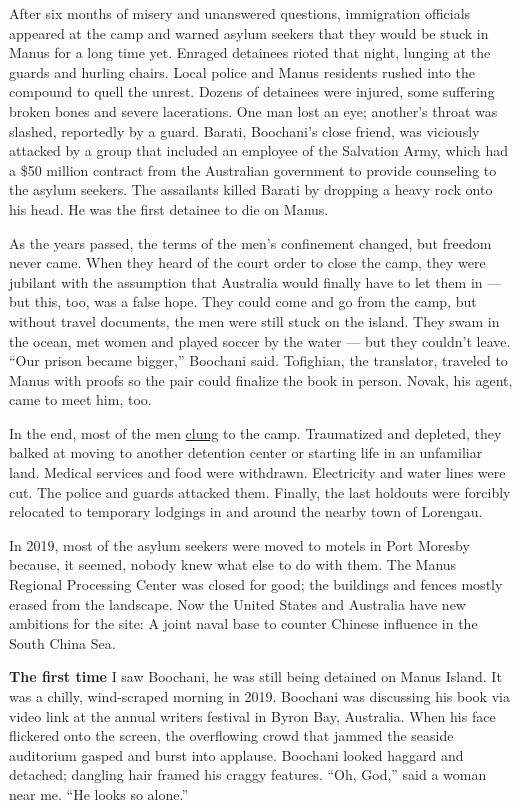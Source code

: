 After six months of misery and unanswered questions, immigration
officials appeared at the camp and warned asylum seekers that they would
be stuck in Manus for a long time yet. Enraged detainees rioted that
night, lunging at the guards and hurling chairs. Local police and Manus
residents rushed into the compound to quell the unrest. Dozens of
detainees were injured, some suffering broken bones and severe
lacerations. One man lost an eye; another's throat was slashed,
reportedly by a guard. Barati, Boochani's close friend, was viciously
attacked by a group that included an employee of the Salvation Army,
which had a \$50 million contract from the Australian government to
provide counseling to the asylum seekers. The assailants killed Barati
by dropping a heavy rock onto his head. He was the first detainee to die
on Manus.

As the years passed, the terms of the men's confinement changed, but
freedom never came. When they heard of the court order to close the
camp, they were jubilant with the assumption that Australia would
finally have to let them in --- but this, too, was a false hope. They
could come and go from the camp, but without travel documents, the men
were still stuck on the island. They swam in the ocean, met women and
played soccer by the water --- but they couldn't leave. ``Our prison
became bigger,'' Boochani said. Tofighian, the translator, traveled to
Manus with proofs so the pair could finalize the book in person. Novak,
his agent, came to meet him, too.

In the end, most of the men
\href{https://www.nytimes.com/2017/11/02/world/australia/manus-island-refugees.html}{clung}
to the camp. Traumatized and depleted, they balked at moving to another
detention center or starting life in an unfamiliar land. Medical
services and food were withdrawn. Electricity and water lines were cut.
The police and guards attacked them. Finally, the last holdouts were
forcibly relocated to temporary lodgings in and around the nearby town
of Lorengau.

In 2019, most of the asylum seekers were moved to motels in Port Moresby
because, it seemed, nobody knew what else to do with them. The Manus
Regional Processing Center was closed for good; the buildings and fences
mostly erased from the landscape. Now the United States and Australia
have new ambitions for the site: A joint naval base to counter Chinese
influence in the South China Sea.

\textbf{The first time} I saw Boochani, he was still being detained on
Manus Island. It was a chilly, wind-scraped morning in 2019. Boochani
was discussing his book via video link at the annual writers festival in
Byron Bay, Australia. When his face flickered onto the screen, the
overflowing crowd that jammed the seaside auditorium gasped and burst
into applause. Boochani looked haggard and detached; dangling hair
framed his craggy features. ``Oh, God,'' said a woman near me. ``He
looks so alone.''

